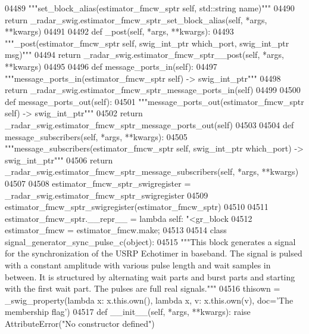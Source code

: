 \begin{DoxyCode}
{{{{{{{{{{{{{{{04489         \textcolor{stringliteral}{"""set\_block\_alias(estimator\_fmcw\_sptr self, std::string name)"""}
04490         \textcolor{keywordflow}{return} \_radar\_swig.estimator\_fmcw\_sptr\_set\_block\_alias(self, *args, **kwargs)
04491 
04492     \textcolor{keyword}{def }_post(self, *args, **kwargs):
04493         \textcolor{stringliteral}{"""\_post(estimator\_fmcw\_sptr self, swig\_int\_ptr which\_port, swig\_int\_ptr msg)"""}
04494         \textcolor{keywordflow}{return} \_radar\_swig.estimator\_fmcw\_sptr\_\_post(self, *args, **kwargs)
04495 
04496     \textcolor{keyword}{def }message_ports_in(self):
04497         \textcolor{stringliteral}{"""message\_ports\_in(estimator\_fmcw\_sptr self) -> swig\_int\_ptr"""}
04498         \textcolor{keywordflow}{return} \_radar\_swig.estimator\_fmcw\_sptr\_message\_ports\_in(self)
04499 
04500     \textcolor{keyword}{def }message_ports_out(self):
04501         \textcolor{stringliteral}{"""message\_ports\_out(estimator\_fmcw\_sptr self) -> swig\_int\_ptr"""}
04502         \textcolor{keywordflow}{return} \_radar\_swig.estimator\_fmcw\_sptr\_message\_ports\_out(self)
04503 
04504     \textcolor{keyword}{def }message_subscribers(self, *args, **kwargs):
04505         \textcolor{stringliteral}{"""message\_subscribers(estimator\_fmcw\_sptr self, swig\_int\_ptr which\_port) -> swig\_int\_ptr"""}
04506         \textcolor{keywordflow}{return} \_radar\_swig.estimator\_fmcw\_sptr\_message\_subscribers(self, *args, **kwargs)
04507 
04508 estimator\_fmcw\_sptr\_swigregister = \_radar\_swig.estimator\_fmcw\_sptr\_swigregister
04509 estimator_fmcw_sptr_swigregister(estimator\_fmcw\_sptr)
04510 
04511 estimator\_fmcw\_sptr.\_\_repr\_\_ = \textcolor{keyword}{lambda} self: \textcolor{stringliteral}{"<gr\_block %
04512 estimator\_fmcw = estimator\_fmcw.make;
04513 
04514 \textcolor{keyword}{class }signal_generator_sync_pulse_c(object):
04515     \textcolor{stringliteral}{"""This block generates a signal for the synchronization of the USRP Echotimer in baseband. The signal
       is pulsed with a constant amplitude with various pulse length and wait samples in between. It is structured
       by alternating wait parts and burst parts and starting with the first wait part. The pulses are full real
       signals."""}
04516     thisown = _swig_property(\textcolor{keyword}{lambda} x: x.this.own(), \textcolor{keyword}{lambda} x, v: x.this.own(v), doc=\textcolor{stringliteral}{'The membership flag'})
04517     \textcolor{keyword}{def }__init__(self, *args, **kwargs): \textcolor{keywordflow}{raise} AttributeError(\textcolor{stringliteral}{"No constructor defined"})
}}}}}}}}}}}}}}}}
\end{DoxyCode}
